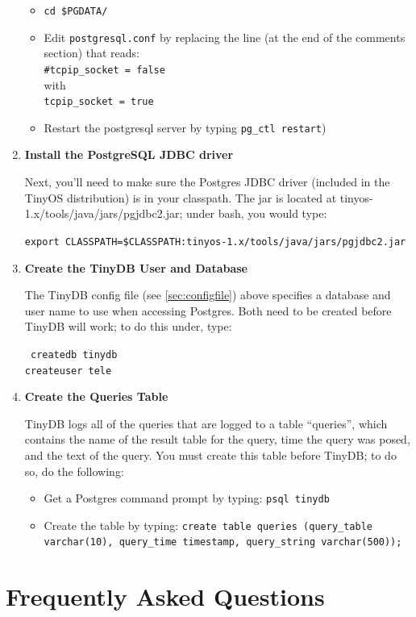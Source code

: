 \documentclass[11pt]{article}
\newcommand{\java}{tinyos-1.x/tools/java}
\begin{document}
\begin{enumerate}
\begin{itemize}
\item {\tt cd \$PGDATA/}
\item Edit {\tt postgresql.conf} by
replacing the line (at the end of the comments section) that reads: \\
{\tt \#tcpip\_socket = false} \\
with \\
{\tt tcpip\_socket = true} \\
\item Restart the postgresql server by typing {\tt pg\_ctl restart})
\end{itemize}

\item{\bf Install the PostgreSQL JDBC driver}

Next, you'll need to make sure the Postgres JDBC driver (included in the TinyOS distribution) is in your classpath.  The
jar is located at \java/jars/pgjdbc2.jar;  under bash, you would type:

{\tt export CLASSPATH=\$CLASSPATH:\java/jars/pgjdbc2.jar}

\item{\bf Create the TinyDB User and Database}

The TinyDB config file (see \ref{sec:configfile}) above specifies a database and user name to use when accessing 
Postgres.  Both need to be created before TinyDB will work;  to do this under, type:

{\tt
createdb tinydb \\
createuser tele \\
}

\item{\bf Create the Queries Table}

TinyDB logs all of the queries that are logged to a table ``queries'', which contains the name of the result table
for the query,  time
the query was posed, and the text of the query.  You must create this table before TinyDB;
to do so, do the following:

\begin{itemize}
\item Get a Postgres command prompt by typing: {\tt psql tinydb}
\item Create the table by typing: {\tt create table queries (query\_table varchar(10), query\_time timestamp, query\_string varchar(500));}
\end{itemize}
\end{enumerate}


\section{Frequently Asked Questions}
\end{document}

